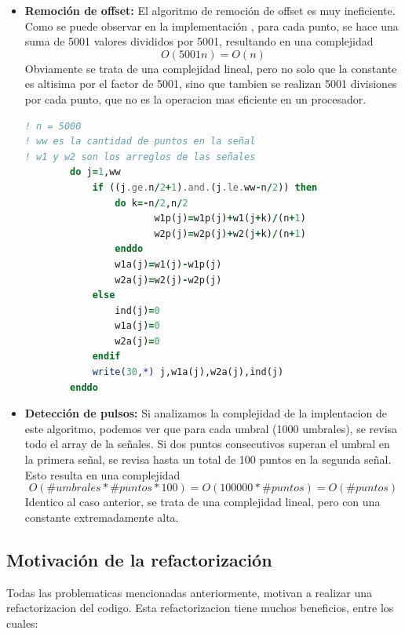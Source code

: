 \documentclass[12pt,a4paper]{article}
\begin{document}
\begin{itemize}
    \item \textbf{Remoción de offset:} El algoritmo de remoción de offset es muy ineficiente. Como se puede observar en la implementación , para cada punto, se hace una suma de 5001 valores divididos por 5001,
    resultando en una complejidad $$O(5001n) = O(n)$$ Obviamente se trata de una complejidad lineal, pero no solo que la constante es altisima por el factor de 5001, sino que tambien se realizan 5001 divisiones por cada punto, que no es la operacion mas eficiente en un procesador.

    \begin{lstlisting}[language=Fortran, label=lst:codigo_remocion_offset, caption={buscador\_de\_gotas.f - Algoritmo ineficiente de remoción de offset}]
! n = 5000
! ww es la cantidad de puntos en la señal
! w1 y w2 son los arreglos de las señales
        do j=1,ww
            if ((j.ge.n/2+1).and.(j.le.ww-n/2)) then
                do k=-n/2,n/2
                       w1p(j)=w1p(j)+w1(j+k)/(n+1)
                       w2p(j)=w2p(j)+w2(j+k)/(n+1)            
                enddo
                w1a(j)=w1(j)-w1p(j)
                w2a(j)=w2(j)-w2p(j)
            else 
                ind(j)=0
                w1a(j)=0
                w2a(j)=0
            endif	
            write(30,*) j,w1a(j),w2a(j),ind(j)
        enddo
    \end{lstlisting}


    \item \textbf{Detección de pulsos:} Si analizamos la complejidad de la implentacion de este algoritmo, podemos ver que para cada umbral (1000 umbrales), se revisa todo el array de la señales. Si dos puntos consecutivos superan el umbral en la primera señal, se revisa hasta un total de 100 puntos en la segunda señal. Esto resulta en una complejidad $$O(\#umbrales * \#puntos * 100) = O(100000 * \#puntos) = O(\#puntos)$$ Identico al caso anterior, se trata de una complejidad lineal, pero con una constante extremadamente alta.
\end{itemize}

\subsection{Motivación de la refactorización}

Todas las problematicas mencionadas anteriormente, motivan a realizar una refactorizacion del codigo. Esta refactorizacion tiene muchos beneficios, entre los cuales:
\end{document}
